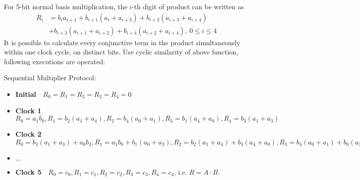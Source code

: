 \documentclass{acm_proc_article-sp}
\begin{document}
For 5-bit normal basis multiplication, the $i$-th digit of product can be written as
\begin{align}
R_i &= b_ia_{i+1} + b_{i+1}(a_i + a_{i+3}) + b_{i+2}(a_{i+3} + a_{i+4}) \nonumber\\
&+ b_{i+3}(a_{i+1} + a_{i+2}) + b_{i+4}
(a_{i+2} + a_{i+4}),\ 0\leq i\leq 4 \nonumber
\end{align}
It is possible to calculate every conjunctive term in the product simultaneously within one clock cycle,
on distinct bits. 
Use cyclic similarity of above function, following executions are operated: 
\begin{Example}
Sequential Multiplier Protocol:
\begin{itemize}
\item \textbf{Initial}\ \ $R_0 = R_1 = R_2 = R_3 = R_4 = 0$
\item \textbf{Clock 1}\ \ $R_0 = a_1b_0, R_1 = b_2(a_1 + a_4), R_2 = b_4(a_0 + a_1), R_3 = b_1(a_4 + a_0), 
			R_4 = b_3(a_1 + a_3)$
\item \textbf{Clock 2}\ \ $R_0 = b_3(a_1 + a_3) + a_0b_4, R_1 = a_1b_0 + b_1(a_0 + a_3), R_2 = b_2(a_1 + a_4)
			+ b_3(a_4 + a_0), R_3 = b_4(a_0 + a_1) + b_0(a_3 + a_4), R_4 = b_1(a_4 + a_0) + b_2(a_0 + a_2)$
\item \textbf{$\dots$}
\item \textbf{Clock 5}\ \ $R_0 = c_0, R_1 = c_1, R_2 = c_2, R_3 = c_3, R_4 = c_4$, i.e. $R = A\cdot B$.
\end{itemize}
\end{Example}
\end{document}
